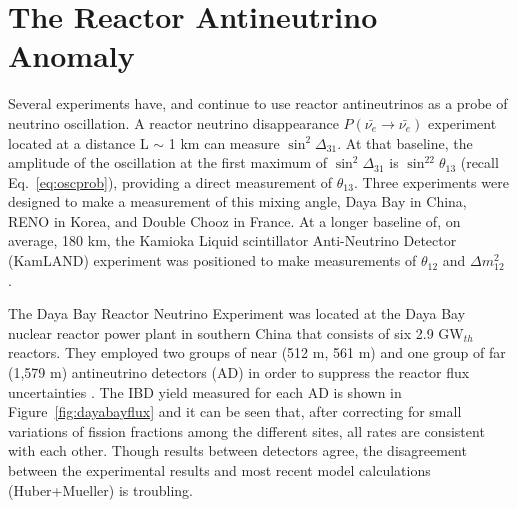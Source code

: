 \section{The Reactor Antineutrino Anomaly}

Several experiments have, and continue to use reactor antineutrinos as a probe of neutrino oscillation. 
A reactor neutrino disappearance $P(\bar{\nu_{e}} \rightarrow \bar{\nu_{e}})$ experiment located at a distance L $\sim$ 1 km can measure $\sin^2\Delta_{31}$. At that baseline, the amplitude of the oscillation at the first maximum of $\sin^2\Delta_{31}$ is $\sin^22\theta_{13}$ (recall Eq.~\ref{eq:oscprob}), providing a direct measurement of $\theta_{13}$.
Three experiments were designed to make a measurement of this mixing angle, Daya Bay in China, RENO in Korea, and Double Chooz in France. 
At a longer baseline of, on average, 180 km, the Kamioka Liquid scintillator
Anti-Neutrino Detector (KamLAND) experiment was positioned to make measurements of $\theta_{12}$ and $\Delta m^2_{12}$ \cite{Eguchi:2002dm, Araki:2004mb}.

The Daya Bay Reactor Neutrino Experiment was located at the Daya Bay nuclear reactor power plant in southern China that consists of six 2.9 GW$_{th}$ reactors. They employed two groups of near (512 m, 561 m) and one group of far (1,579 m) antineutrino detectors (AD) in order to suppress the reactor flux uncertainties \cite{An:2015qga,DayaBayAnomaly}.
The IBD yield measured for each AD is shown in Figure~\ref{fig:dayabayflux} and it can be seen that, after correcting for small variations of fission fractions among the different sites, all rates are consistent with each other. Though results between detectors agree, the disagreement between the experimental results and most recent model calculations (Huber+Mueller) is troubling. 

